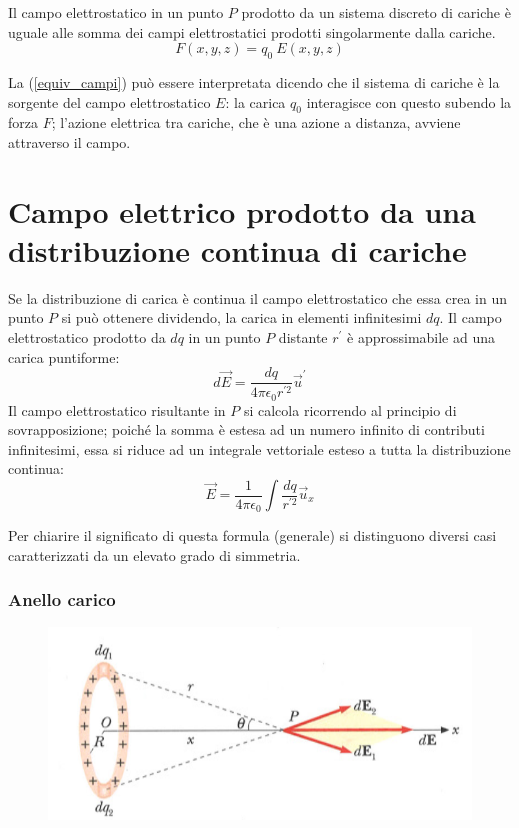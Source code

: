 \documentclass[class=book, crop=false, oneside, 12pt]{standalone}
\begin{document}
Il campo elettrostatico in un punto \(P\) prodotto da un sistema discreto di cariche è uguale alle somma dei campi elettrostatici prodotti singolarmente dalla cariche.
\begin{equation} \label{equiv_campi}
    F ( x, y, z) = q_0 \ E ( x, y, z) 
\end{equation}

La (\ref{equiv_campi}) può essere interpretata dicendo che il sistema di cariche è la sorgente del campo elettrostatico \(E\): la carica \(q_0\) interagisce con questo subendo la forza \(F\); 
l'azione elettrica tra cariche, che è una azione a distanza, avviene attraverso il campo. 

\section{Campo elettrico prodotto da una distribuzione continua di cariche}

Se la distribuzione di carica è continua il campo elettrostatico che essa crea in un punto \(P\) si può ottenere dividendo, la carica in elementi infinitesimi \(dq\).  
Il campo elettrostatico prodotto da \(dq\) in un punto \(P\) distante \(r^{\prime}\) è approssimabile ad una carica puntiforme: 
\begin{equation*}
    d \overrightarrow{E} = \frac{d q}{4 \pi \epsilon_0 r^{\prime 2}} \overrightarrow{u}^{\prime}
\end{equation*}
Il campo elettrostatico risultante in \(P\) si calcola ricorrendo al principio di sovrapposizione; poiché la somma è estesa ad un numero infinito di contributi infinitesimi, essa si riduce ad un integrale vettoriale esteso a tutta la distribuzione continua:
\begin{equation}
    \overrightarrow{E} = \frac{1}{4 \pi \epsilon_0} \int \frac{dq}{r^{\prime 2}} \overrightarrow{u}_x
\end{equation}

Per chiarire il significato di questa formula (generale) si distinguono diversi casi caratterizzati da un elevato grado di simmetria.

\subsubsection*{Anello carico}

\begin{figure}[h]
    \includegraphics[scale=0.4]{anello_carico.png}
    \centering
    \caption{}
\end{figure}
\end{document}
